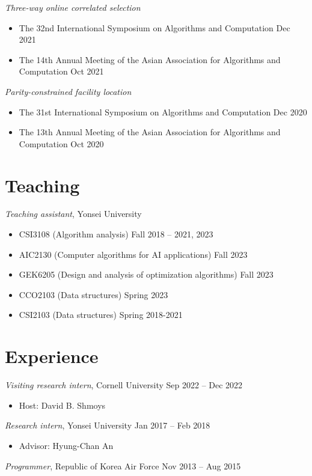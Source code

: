 \documentclass{cv}
\begin{document}
\textsl{Three-way online correlated selection}
\vspace{\killinitspace}
\begin{itemize}
\item The 32nd International Symposium on Algorithms and Computation \hfill Dec 2021
\item The 14th Annual Meeting of the Asian Association for Algorithms and Computation \hfill Oct 2021
\end{itemize}

\textsl{Parity-constrained facility location}
\vspace{\killinitspace}
\begin{itemize}
\item The 31st International Symposium on Algorithms and Computation \hfill Dec 2020
\item The 13th Annual Meeting of the Asian Association for Algorithms and Computation \hfill Oct 2020
\end{itemize}

\section{Teaching}
\textsl{Teaching assistant}, Yonsei University
\vspace{\killinitspace}
\begin{itemize}
\item CSI3108 (Algorithm analysis) \hfill Fall 2018 -- 2021, 2023
\item AIC2130 (Computer algorithms for AI applications) \hfill Fall 2023
\item GEK6205 (Design and analysis of optimization algorithms) \hfill Fall 2023
\item CCO2103 (Data structures) \hfill Spring 2023
\item CSI2103 (Data structures) \hfill Spring 2018-2021
\end{itemize}

\section{Experience}
\textsl{Visiting research intern}, Cornell University \hfill Sep 2022 -- Dec 2022
\vspace{\killinitspace}
\begin{itemize}
\item[] Host: David B. Shmoys
\end{itemize}

\textsl{Research intern}, Yonsei University \hfill Jan 2017 -- Feb 2018
\vspace{\killinitspace}
\begin{itemize}
\item[] Advisor: Hyung-Chan An
\end{itemize}

\textsl{Programmer}, Republic of Korea Air Force \hfill Nov 2013 -- Aug 2015
\end{document}
